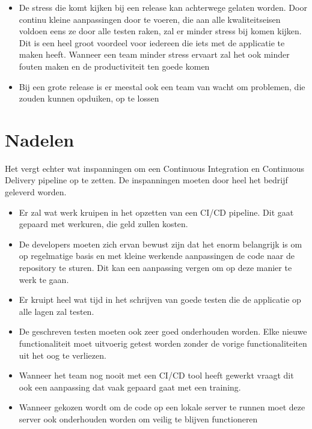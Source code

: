 \begin{itemize}
    \item De stress die komt kijken bij een release kan achterwege gelaten worden. Door continu kleine aanpassingen door te voeren, die aan alle kwaliteitseisen voldoen eens ze door alle testen raken, zal er minder stress bij komen kijken. Dit is een heel groot voordeel voor iedereen die iets met de applicatie te maken heeft. Wanneer een team minder stress ervaart zal het ook minder fouten maken en de productiviteit ten goede komen
    \item Bij een grote release is er meestal ook een team van wacht om problemen, die zouden kunnen opduiken, op te lossen
\end{itemize}

\section{Nadelen}
Het vergt echter wat inspanningen om een Continuous Integration en Continuous Delivery pipeline op te zetten. De inspanningen moeten door heel het bedrijf geleverd worden.
\begin{itemize}
    \item Er zal wat werk kruipen in het opzetten van een CI/CD pipeline. Dit gaat gepaard met werkuren, die geld zullen kosten.
    \item De developers moeten zich ervan bewust zijn dat het enorm belangrijk is om op regelmatige basis en met kleine werkende aanpassingen de code naar de repository te sturen. Dit kan een aanpassing vergen om op deze manier te werk te gaan.
    \item Er kruipt heel wat tijd in het schrijven van goede testen die de applicatie op alle lagen zal testen.
    \item De geschreven testen moeten ook zeer goed onderhouden worden. Elke nieuwe functionaliteit moet uitvoerig getest worden zonder de vorige functionaliteiten uit het oog te verliezen.
    \item Wanneer het team nog nooit met een CI/CD tool heeft gewerkt vraagt dit ook een aanpassing dat vaak gepaard gaat met een training.
    \item Wanneer gekozen wordt om de code op een lokale server te runnen moet deze server ook onderhouden worden om veilig te blijven functioneren
\end{itemize}